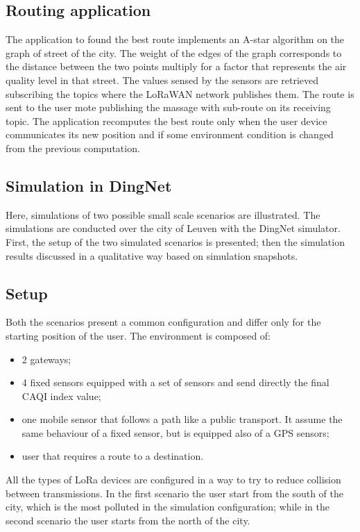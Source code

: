 \subsection*{Routing application}
The application to found the best route implements an A-star algorithm on the graph of street of the city. 
The weight of the edges of the graph corresponds to the distance between the two points multiply for a factor that represents the air quality level in that street. 
The values sensed by the sensors are retrieved subscribing the topics where the LoRaWAN network publishes them. 
The route is sent to the user mote publishing the massage with sub-route on its receiving topic.
The application recomputes the best route only when the user device communicates its new position and if some environment condition is changed from the previous computation.

\subsection{Simulation in DingNet}
Here, simulations of two possible small scale scenarios are illustrated. 
The simulations are conducted over the city of Leuven with the DingNet simulator.
First, the setup of the two simulated scenarios is presented; then the simulation results discussed in a qualitative way based on simulation snapshots.

\subsection*{Setup}
Both the scenarios present a common configuration and differ only for the starting position of the user.
The environment is composed of:
\begin{itemize}
    \item 2 gateways;
    \item 4 fixed sensors equipped with a set of sensors and send directly the final CAQI index value;
    \item one mobile sensor that follows a path like a public transport. It assume the same behaviour of a fixed sensor, but is equipped also of a GPS sensors;
    \item user that requires a route to a destination.
\end{itemize} 
All the types of LoRa devices are configured in a way to try to reduce collision between transmissions.
In the first scenario the user start from the south of the city, which is the most polluted in the simulation configuration; while in the second scenario the user starts from the north of the city.

